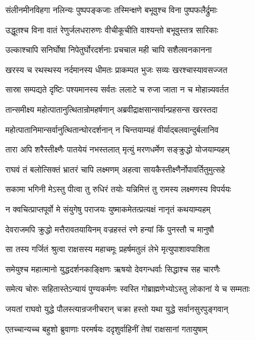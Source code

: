 \twolineshloka
{संलीनमीनविहगा नलिन्यः पुष्पपङ्कजाः}
{तस्मिन्क्षणे बभूवुश्च विना पुष्पफलैर्द्रुमाः} %

\twolineshloka
{उद्धूतश्च विना वातं रेणुर्जलधरारुणः}
{वीचीकूचीति वाश्यन्तो बभूवुस्तत्र सारिकाः} %

\twolineshloka
{उल्काश्चापि सनिर्घोषा निपेतुर्घोरदर्शनाः}
{प्रचचाल मही चापि सशैलवनकानना} %

\twolineshloka
{खरस्य च रथस्थस्य नर्दमानस्य धीमतः}
{प्राकम्पत भुजः सव्यः खरश्चास्यावसज्जत} %

\twolineshloka
{सास्रा सम्पद्यते दृष्टिः पश्यमानस्य सर्वतः}
{ललाटे च रुजा जाता न च मोहान्न्यवर्तत} %

\twolineshloka
{तान्समीक्ष्य महोत्पातानुत्थितान्रोमहर्षणान्}
{अब्रवीद्राक्षसान्सर्वान्प्रहसन्स खरस्तदा} %

\twolineshloka
{महोत्पातानिमान्सर्वानुत्थितान्घोरदर्शनान्}
{न चिन्तयाम्यहं वीर्याद्बलवान्दुर्बलानिव} %

\twolineshloka
{तारा अपि शरैस्तीक्ष्णैः पातयेयं नभस्तलात्}
{मृत्युं मरणधर्मेण सङ्क्रुद्धो योजयाम्यहम्} %

\twolineshloka
{राघवं तं बलोत्सिक्तं भ्रातरं चापि लक्ष्मणम्}
{अहत्वा सायकैस्तीक्ष्णैर्नोपावर्तितुमुत्सहे} %

\twolineshloka
{सकामा भगिनी मेऽस्तु पीत्वा तु रुधिरं तयोः}
{यन्निमित्तं तु रामस्य लक्ष्मणस्य विपर्ययः} %

\twolineshloka
{न क्वचित्प्राप्तपूर्वो मे संयुगेषु पराजयः}
{युष्माकमेतत्प्रत्यक्षं नानृतं कथयाम्यहम्} %

\twolineshloka
{देवराजमपि क्रुद्धो मत्तैरावतयायिनम्}
{वज्रहस्तं रणे हन्यां किं पुनस्तौ च मानुषौ} %

\twolineshloka
{सा तस्य गर्जितं श्रुत्वा राक्षसस्य महाचमूः}
{प्रहर्षमतुलं लेभे मृत्युपाशावपाशिता} %

\twolineshloka
{समेयुश्च महात्मानो युद्धदर्शनकाङ्क्षिणः}
{ऋषयो देवगन्धर्वाः सिद्धाश्च सह चारणैः} %

\twolineshloka
{समेत्य चोरुः सहितास्तेऽन्यायं पुण्यकर्मणः}
{स्वस्ति गोब्राह्मणेभ्योऽस्तु लोकानां ये च सम्मताः} %

\twolineshloka
{जयतां राघवो युद्धे पौलस्त्यान्रजनीचरान्}
{चक्रा हस्तो यथा युद्धे सर्वानसुरपुङ्गवान्} %

\twolineshloka
{एतच्चान्यच्च बहुशो ब्रुवाणाः परमर्षयः}
{ददृशुर्वाहिनीं तेषां राक्षसानां गतायुषाम्} %

